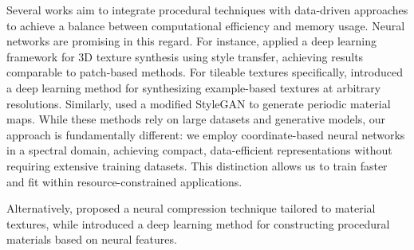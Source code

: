 Several works aim to integrate procedural techniques with data-driven approaches to achieve a balance between computational efficiency and memory usage. Neural networks are promising in this regard. For instance, \citet{Gutierrez-2019} applied a deep learning framework for 3D texture synthesis using style transfer, achieving results comparable to patch-based methods. For tileable textures specifically, \citet{deeptile} introduced a deep learning method for synthesizing example-based textures at arbitrary resolutions. Similarly, \citet{zhou2022tilegen} used a modified StyleGAN to generate periodic material maps. While these methods rely on large datasets and generative models, our approach is fundamentally different: we employ coordinate-based neural networks in a spectral domain, achieving compact, data-efficient representations without requiring extensive training datasets. This distinction allows us to train faster and fit within resource-constrained applications.






Alternatively, \citet{ntc2023} proposed a neural compression technique tailored to material textures, while \citet{match} introduced a deep learning method for constructing procedural materials based on neural features. 


